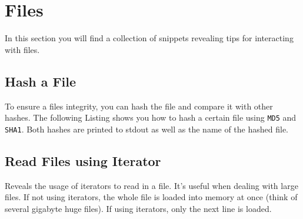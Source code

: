 
\section{Files}

In this section you will find a collection of snippets revealing tips for interacting with files.


\subsection{Hash a File}

To ensure a files integrity, you can hash the file and compare it with other hashes.
The following Listing shows you how to hash a certain file using \lstinline{MD5} and \lstinline{SHA1}.
Both hashes are printed to stdout as well as the name of the hashed file.




\subsection{Read Files using Iterator}

Reveals the usage of iterators to read in a file.
It's useful when dealing with large files.
If not using iterators, the whole file is loaded into memory at once (think of several gigabyte huge files).
If using iterators, only the next line is loaded.


